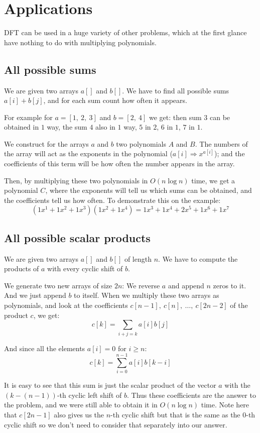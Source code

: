 \documentclass{report}
\begin{document}
\chapter{Applications}

DFT can be used in a huge variety of other problems, which at the first glance have nothing to do with multiplying polynomials.

\section{All possible sums}

We are given two arrays $a[]$ and $b[]$. We have to find all possible sums $a[i] + b[j]$, and for each sum count how often it appears.

For example for $a = [1,~ 2,~ 3]$ and $b = [2,~ 4]$ we get: then sum $3$ can be obtained in $1$ way, the sum $4$ also in $1$ way, $5$ in $2$, $6$ in $1$, $7$ in $1$.

We construct for the arrays $a$ and $b$ two polynomials $A$ and $B$. The numbers of the array will act as the exponents in the polynomial ($a[i] \Rightarrow x^{a[i]}$); and the coefficients of this term will be how often the number appears in the array.

Then, by multiplying these two polynomials in $O(n \log n)$ time, we get a polynomial $C$, where the exponents will tell us which sums can be obtained, and the coefficients tell us how often. To demonstrate this on the example:
$$(1 x^1 + 1 x^2 + 1 x^3) (1 x^2 + 1 x^4) = 1 x^3 + 1 x^4 + 2 x^5 + 1 x^6 + 1 x^7$$

\section{All possible scalar products}

We are given two arrays $a[]$ and $b[]$ of length $n$. We have to compute the products of $a$ with every cyclic shift of $b$.

We generate two new arrays of size $2n$: We reverse $a$ and append $n$ zeros to it. And we just append $b$ to itself. When we multiply these two arrays as polynomials, and look at the coefficients $c[n-1],~ c[n],~ \dots,~ c[2n-2]$ of the product $c$, we get:
$$c[k] = \sum_{i+j=k} a[i] b[j]$$

And since all the elements $a[i] = 0$ for $i \ge n$:
$$c[k] = \sum_{i=0}^{n-1} a[i] b[k-i]$$

It is easy to see that this sum is just the scalar product of the vector $a$ with the $(k - (n - 1))$-th cyclic left shift of $b$. Thus these coefficients are the answer to the problem, and we were still able to obtain it in $O(n \log n)$ time. Note here that $c[2n-1]$ also gives us the $n$-th cyclic shift but that is the same as the $0$-th cyclic shift so we don't need to consider that separately into our answer.
\end{document}
